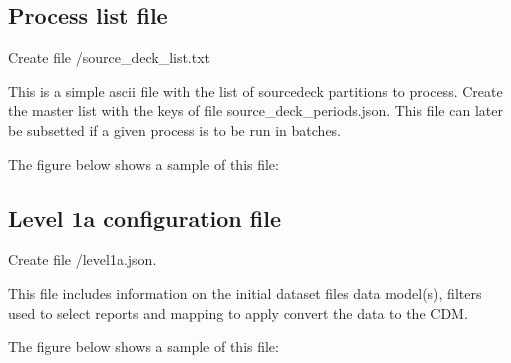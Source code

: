 \documentclass[letterpaper,10pt,english]{sphinxmanual}
\begin{document}
\subsection{Process list file}
\label{\detokenize{index:process-list-file}}\label{\detokenize{index:id2}}
Create file /source\_deck\_list.txt

This is a simple ascii file with the list of source\sphinxhyphen{}deck partitions to process.
Create the master list with the keys of file source\_deck\_periods.json. This file
can later be subsetted if a given process is to be run in batches.

The figure below shows a sample of this file:

\begin{sphinxVerbatim}[commandchars=\\\{\}]
\end{sphinxVerbatim}


\subsection{Level 1a configuration file}
\label{\detokenize{index:level-1a-configuration-file}}\label{\detokenize{index:level1a-config-file}}
Create file /level1a.json.

This file includes information on the initial dataset files data model(s),
filters used to select reports and mapping to apply convert the data to the CDM.

The figure below shows a sample of this file:
\end{document}
